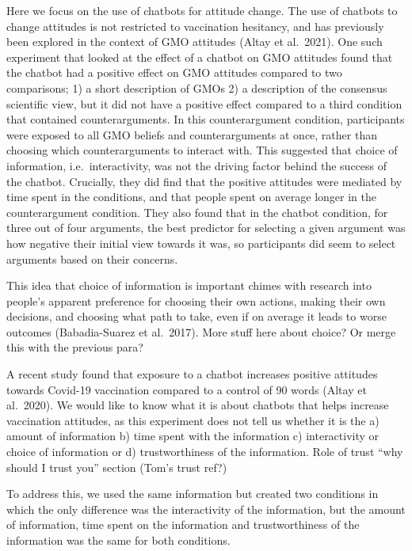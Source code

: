 \documentclass[
  english,
  ,jou,floatsintext]{apa6}
\begin{document}
Here we focus on the use of chatbots for attitude change. The use of chatbots to change attitudes is not restricted to vaccination hesitancy, and has previously been explored in the context of GMO attitudes (Altay et al.~2021). One such experiment that looked at the effect of a chatbot on GMO attitudes found that the chatbot had a positive effect on GMO attitudes compared to two comparisons; 1) a short description of GMOs 2) a description of the consensus scientific view, but it did not have a positive effect compared to a third condition that contained counterarguments. In this counterargument condition, participants were exposed to all GMO beliefs and counterarguments at once, rather than choosing which counterarguments to interact with. This suggested that choice of information, i.e.~interactivity, was not the driving factor behind the success of the chatbot. Crucially, they did find that the positive attitudes were mediated by time spent in the conditions, and that people spent on average longer in the counterargument condition. They also found that in the chatbot condition, for three out of four arguments, the best predictor for selecting a given argument was how negative their initial view towards it was, so participants did seem to select arguments based on their concerns.

This idea that choice of information is important chimes with research into people's apparent preference for choosing their own actions, making their own decisions, and choosing what path to take, even if on average it leads to worse outcomes (Babadia-Suarez et al.~2017). More stuff here about choice? Or merge this with the previous para?

A recent study found that exposure to a chatbot increases positive attitudes towards Covid-19 vaccination compared to a control of 90 words (Altay et al.~2020). We would like to know what it is about chatbots that helps increase vaccination attitudes, as this experiment does not tell us whether it is the a) amount of information b) time spent with the information c) interactivity or choice of information or d) trustworthiness of the information. Role of trust ``why should I trust you'' section (Tom's trust ref?)

To address this, we used the same information but created two conditions in which the only difference was the interactivity of the information, but the amount of information, time spent on the information and trustworthiness of the information was the same for both conditions.
\end{document}
